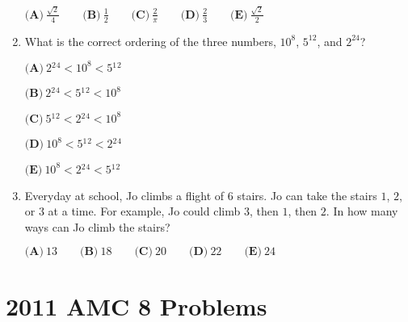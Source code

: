 \documentclass{article}
\begin{document}
\begin{enumerate}[label=\arabic*., itemsep=0.5em]
\( \textbf{(A)}\ \frac{\sqrt 2}{4}\qquad\textbf{(B)}\ \frac{1}{2}\qquad\textbf{(C)}\ \frac{2}{\pi}\qquad\textbf{(D)}\ \frac{2}{3}\qquad\textbf{(E)}\ \frac{\sqrt 2}{2} \)\par \vspace{0.5em}\item What is the correct ordering of the three numbers, \(10^8\), \(5^{12}\), and \(2^{24}\)?

\( \textbf{(A)}\ 2{}^2{}^4<10^8<5{}^1{}^2 \)

\( \textbf{(B)}\ 2{}^2{}^4<5{}^1{}^2<10^8 \)

\( \textbf{(C)}\ 5{}^1{}^2<2{}^2{}^4<10^8 \)

\( \textbf{(D)}\ 10^8<5{}^1{}^2<2{}^2{}^4\)

\( \textbf{(E)}\ 10^8<2{}^2{}^4<5{}^1{}^2 \)\par \vspace{0.5em}\item Everyday at school, Jo climbs a flight of \(6\) stairs. Jo can take the stairs \(1\), \(2\), or \(3\) at a time. For example, Jo could climb \(3\), then \(1\), then \(2\). In how many ways can Jo climb the stairs?

\( \textbf{(A)}\ 13 \qquad\textbf{(B)}\ 18\qquad\textbf{(C)}\ 20\qquad\textbf{(D)}\ 22\qquad\textbf{(E)}\ 24 \)\par \vspace{0.5em}\end{enumerate}\newpage\section*{2011 AMC 8 Problems}
\end{document}
